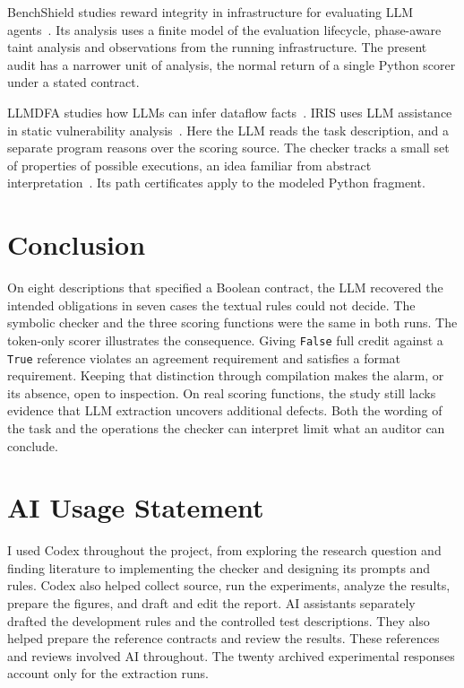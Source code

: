\documentclass[sigconf]{acmart}
\begin{document}
BenchShield studies reward integrity in infrastructure for evaluating LLM agents~\cite{benchshield}. Its analysis uses a finite model of the evaluation lifecycle, phase-aware taint analysis and observations from the running infrastructure. The present audit has a narrower unit of analysis, the normal return of a single Python scorer under a stated contract.

LLMDFA studies how LLMs can infer dataflow facts~\cite{llmdfa}. IRIS uses LLM assistance in static vulnerability analysis~\cite{iris}. Here the LLM reads the task description, and a separate program reasons over the scoring source. The checker tracks a small set of properties of possible executions, an idea familiar from abstract interpretation~\cite{abstractinterpretation}. Its path certificates apply to the modeled Python fragment.

\section{Conclusion}

On eight descriptions that specified a Boolean contract, the LLM recovered the intended obligations in seven cases the textual rules could not decide. The symbolic checker and the three scoring functions were the same in both runs. The token-only scorer illustrates the consequence. Giving \texttt{False} full credit against a \texttt{True} reference violates an agreement requirement and satisfies a format requirement. Keeping that distinction through compilation makes the alarm, or its absence, open to inspection. On real scoring functions, the study still lacks evidence that LLM extraction uncovers additional defects. Both the wording of the task and the operations the checker can interpret limit what an auditor can conclude.

\section*{AI Usage Statement}

I used Codex throughout the project, from exploring the research question and finding literature to implementing the checker and designing its prompts and rules. Codex also helped collect source, run the experiments, analyze the results, prepare the figures, and draft and edit the report. AI assistants separately drafted the development rules and the controlled test descriptions. They also helped prepare the reference contracts and review the results. These references and reviews involved AI throughout. The twenty archived experimental responses account only for the extraction runs.
\end{document}
